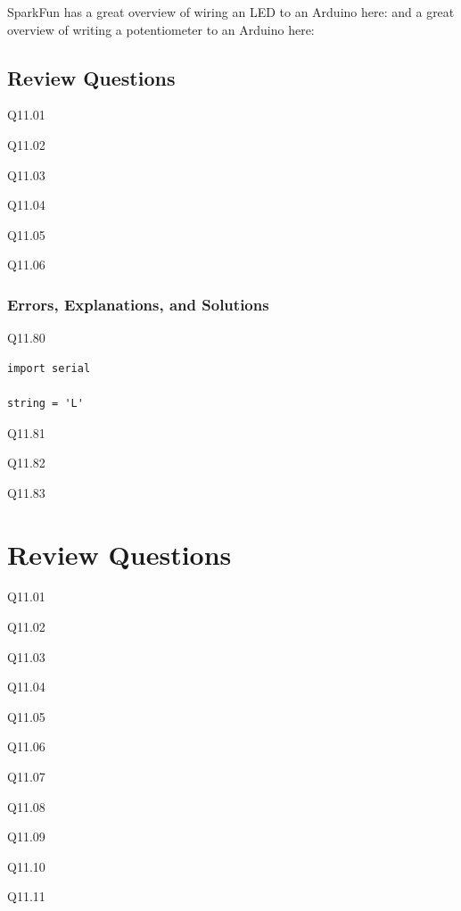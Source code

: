 \documentclass{book}
\newenvironment{problems}{}{}  %
\begin{document}
SparkFun has a great overview of wiring an LED to an Arduino here: and a
great overview of writing a potentiometer to an Arduino here:
    




    
        \subsection{Review Questions}\label{review-questions}

Q11.01

Q11.02

Q11.03

Q11.04

Q11.05

Q11.06

\subsubsection{Errors, Explanations, and
Solutions}\label{errors-explanations-and-solutions}

Q11.80

\begin{lstlisting}
import serial

string = 'L'
\end{lstlisting}

Q11.81

Q11.82

Q11.83
    




    
        \section{Review Questions}\label{review-questions}
    




    
        \begin{problems}
        Q11.01

Q11.02

Q11.03

Q11.04

Q11.05

Q11.06

Q11.07

Q11.08

Q11.09

Q11.10

Q11.11
        \end{problems}
\end{document}
